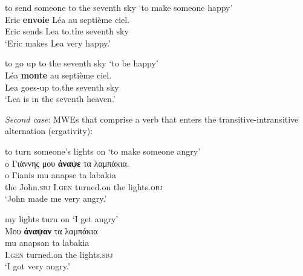 \documentclass[output=paper]{langsci/langscibook}
\begin{document}
\begin{exe}
\settowidth {}
\ex \label{ex:3:31}
to send someone to the seventh sky `to make someone happy'\\
\gll Eric \textbf{envoie} Léa au septième ciel.  \\
Eric sends Lea to.the seventh sky {}\\ 
\glt %
‘Eric makes Lea very happy.’
\end{exe}

\begin{exe}
\settowidth {}
\ex \label{ex:3:32}
to go up to the seventh sky `to be happy'\\
\gll Léa \textbf{monte} au septième ciel. \\
Lea goes-up to.the seventh sky {}\\  
\glt %
‘Lea is in the seventh heaven.’
\end{exe}

\textit{Second case}: MWEs that comprise a verb that enters the 
transitive-intransitive
alternation (ergativity):

\begin{exe}
\settowidth {}
\ex \label{ex:3:33}
to turn someone's lights on `to make someone angry'\\
\glll  o Γιάννης μου \textbf{άναψε} τα λαμπάκια.	 \\
o Γianis mu anapse ta labakia {}\\
the John.\textsc{sbj} I.\textsc{gen} turned.on the lights.\textsc{obj} \\ 
\glt %
‘John made me very angry.’
\end{exe}

\begin{exe}
\settowidth {}
\ex \label{ex:3:34}
my lights turn on `I get angry'\\
\glll Mου \textbf{άναψαν} τα λαμπάκια	 \\
 	mu anapsan ta labakia\\
	I.\textsc{gen} turned.on the lights.\textsc{sbj}\\ 
\glt  	%
‘I got very angry.’
\end{exe}
\end{document}
